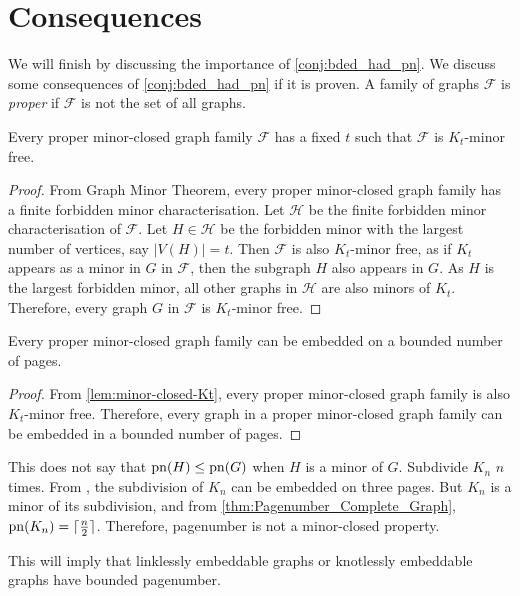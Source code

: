 \section{Consequences}
We will finish by discussing the importance of \cref{conj:bded_had_pn}. We discuss some consequences of \cref{conj:bded_had_pn} if it is proven. 
A family of graphs $\mathcal{F}$ is \textit{proper} if $\mathcal{F}$ is not the set of all graphs. 

\begin{lemma}\label{lem:minor-closed-Kt}
    Every proper minor-closed graph family $\mathcal{F}$ has a fixed $t$ such that $\mathcal{F}$ is $K_t$-minor free. 
\end{lemma}

\begin{proof}
    From \textcite{robertsonGraphMinorsXX2004} Graph Minor Theorem, every proper minor-closed graph family has a finite forbidden minor characterisation. Let $\mathcal{H}$ be the finite forbidden minor characterisation of $\mathcal{F}$. Let $H \in \mathcal{H}$ be the forbidden minor with the largest number of vertices, say $|V(H)| = t$. Then $\mathcal{F}$ is also $K_t$-minor free, as if $K_t$ appears as a minor in $G$ in $\mathcal{F}$, then the subgraph $H$ also appears in $G$. As $H$ is the largest forbidden minor, all other graphs in $\mathcal{H}$ are also minors of $K_t$. Therefore, every graph $G$ in $\mathcal{F}$ is $K_t$-minor free.
\end{proof}

\begin{lemma}\label{lem:Minor-Closed_Pagenumber}
    Every proper minor-closed graph family can be embedded on a bounded number of pages.
\end{lemma}
\begin{proof}
    From \cref{lem:minor-closed-Kt}, every proper minor-closed graph family is also $K_t$-minor free. Therefore, every graph in a proper minor-closed graph family can be embedded in a bounded number of pages.
\end{proof}

This does not say that $\operatorname{pn}(H) \leq \operatorname{pn}(G)$ when $H$ is a minor of $G$. Subdivide $K_n$ $n$ times. From \textcite{atneosenEmbeddabilityCompactaNbooks}, the subdivision of $K_n$ can be embedded on three pages. But $K_n$ is a minor of its subdivision, and from \cref{thm:Pagenumber_Complete_Graph}, $\operatorname{pn}(K_n) = \lceil \frac{n}{2} \rceil$. Therefore, pagenumber is not a minor-closed property. 

This will imply that linklessly embeddable graphs or knotlessly embeddable graphs have bounded pagenumber. 

